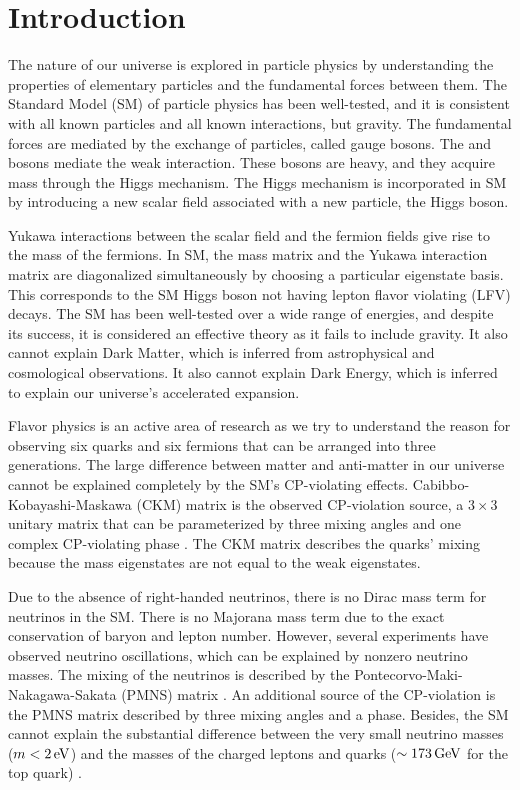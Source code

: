 %
%

\chapter{Introduction}

The nature of our universe is explored in particle physics by understanding the properties of elementary particles and the fundamental forces between them. The Standard Model (SM) of particle physics has been well-tested, and it is consistent with all known particles and all known interactions, but gravity. The fundamental forces are mediated by the exchange of particles, called gauge bosons. The \PW and \PZ bosons mediate the weak interaction. These bosons are heavy, and they acquire mass through the Higgs mechanism. The Higgs mechanism is incorporated in SM by introducing a new scalar field associated with a new particle, the Higgs boson.

Yukawa interactions between the scalar field and the fermion fields give rise to the mass of the fermions. In SM, the mass matrix and the Yukawa interaction matrix are diagonalized simultaneously by choosing a particular eigenstate basis. This corresponds to the SM Higgs boson not having lepton flavor violating (LFV) decays. The SM has been well-tested over a wide range of energies, and despite its success, it is considered an effective theory as it fails to include gravity. It also cannot explain Dark Matter, which is inferred from astrophysical and cosmological observations. It also cannot explain Dark Energy, which is inferred to explain our universe's accelerated expansion.

Flavor physics is an active area of research as we try to understand the reason for observing six quarks and six fermions that can be arranged into three generations. The large difference between matter and anti-matter in our universe cannot be explained completely by the SM's CP-violating effects. Cabibbo-Kobayashi-Maskawa (CKM) matrix is the observed CP-violation source, a $3 \times 3$ unitary matrix that can be parameterized by three mixing angles and one complex CP-violating phase \cite{Tanabashi:2018oca}. The CKM matrix describes the quarks' mixing because the mass eigenstates are not equal to the weak eigenstates.

Due to the absence of right-handed neutrinos, there is no Dirac mass term for neutrinos in the SM. There is no Majorana mass term due to the exact conservation of baryon and lepton number. However, several experiments have observed neutrino oscillations, which can be explained by nonzero neutrino masses. The mixing of the neutrinos is described by the Pontecorvo-Maki-Nakagawa-Sakata (PMNS) matrix \cite{Tanabashi:2018oca}. An additional source of the CP-violation is the PMNS matrix described by three mixing angles and a phase. Besides, the SM cannot explain the substantial difference between the very small neutrino masses ($m < 2 \,\text{e\hspace{-.08em}V}$) and the masses of the charged leptons and quarks ($\sim 173 \,\text{Ge\hspace{-.08em}V}$ for the top quark) \cite{Tanabashi:2018oca}.

